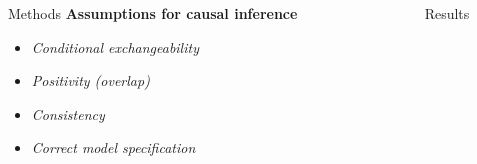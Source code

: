 \documentclass[final]{beamer}
\newlength{\sepwid}
\newlength{\onecolwid}
\begin{document}
\begin{frame}[t]
\begin{columns}[t,onlytextwidth,totalwidth=\onecolwid]
\begin{column}{\onecolwid}
\begin{block}{Methods}
\vspace{0.5\baselineskip}\textbf{Assumptions for causal inference}
\vspace{0.5\baselineskip}

\begin{minipage}{\linewidth}
\begin{itemize}\setlength{\itemsep}{7pt}
\item \textit{Conditional exchangeability}
\item \textit{Positivity (overlap)}
\item \textit{Consistency}
\item \textit{Correct model specification}
\end{itemize}
\end{minipage}\vspace{0.25\baselineskip}

\end{block}

\end{column} %

\begin{column}{\sepwid}\end{column} %

\begin{column}{\onecolwid} %

\begin{block}{Results}


\end{block}
\end{column}
\end{columns}
\end{frame}
\end{document}
